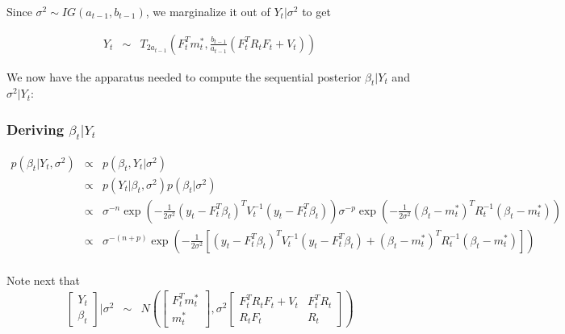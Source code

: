 \documentclass[
]{book}
\theoremstyle{definition}
\theoremstyle{definition}
\theoremstyle{definition}
\theoremstyle{definition}
\theoremstyle{remark}
\begin{document}
Since \(\sigma^{2} \sim IG(a_{t-1},b_{t-1})\), we marginalize it out of \(Y_{t}\vert \sigma^{2}\) to get

\begin{eqnarray*}
Y_{t} &\sim& T_{2a_{t-1}}(F_{t}^{T}m^{*}_{t}, \frac{b_{t-1}}{a_{t-1}}(F_{t}^{T}R_{t}F_{t} + V_{t}))
\end{eqnarray*}

We now have the apparatus needed to compute the sequential posterior \(\beta_{t}\vert Y_{t}\) and \(\sigma^{2}\vert Y_{t}\):

\hypertarget{deriving-beta_tvert-y_t}{%
\subsubsection{\texorpdfstring{Deriving \(\beta_{t}\vert Y_{t}\)}{Deriving \textbackslash beta\_\{t\}\textbackslash vert Y\_\{t\}}}\label{deriving-beta_tvert-y_t}}

\begin{eqnarray*}
p(\beta_{t} \vert Y_{t}, \sigma^{2}) &\propto& p(\beta_{t}, Y_{t}\vert \sigma^{2})\\
 &\propto& p(Y_{t}\vert \beta_{t},\sigma^{2})p(\beta_{t}\vert \sigma^{2})\\
 &\propto& \sigma^{-n}\exp(-\frac{1}{2\sigma^{2}}(y_{t} - F_{t}^{T}\beta_{t})^{T}V_{t}^{-1}(y_{t} - F_{t}^{T}\beta_{t}))\sigma^{-p}\exp(-\frac{1}{2\sigma^{2}}(\beta_{t} - m^{*}_{t})^{T}R_{t}^{-1}(\beta_{t} - m^{*}_{t}))\\
 &\propto& \sigma^{-(n+p)}\exp(-\frac{1}{2\sigma^{2}}[(y_{t} - F_{t}^{T}\beta_{t})^{T}V_{t}^{-1}(y_{t} - F_{t}^{T}\beta_{t}) + (\beta_{t} - m^{*}_{t})^{T}R_{t}^{-1}(\beta_{t} - m^{*}_{t})])\\
\end{eqnarray*}

Note next that
\begin{eqnarray*}
\begin{bmatrix}Y_{t}\\ \beta_{t}\end{bmatrix}\vert \sigma^{2} &\sim& N\left(\begin{bmatrix}F_{t}^{T}m^{*}_{t}\\ m^{*}_{t}\end{bmatrix},\sigma^{2}\begin{bmatrix}F_{t}^{T}R_{t}F_{t} + V_{t} & F_{t}^{T}R_{t}\\
R_{t}F_{t} & R_{t}\end{bmatrix}\right)
\end{eqnarray*}
\end{document}
